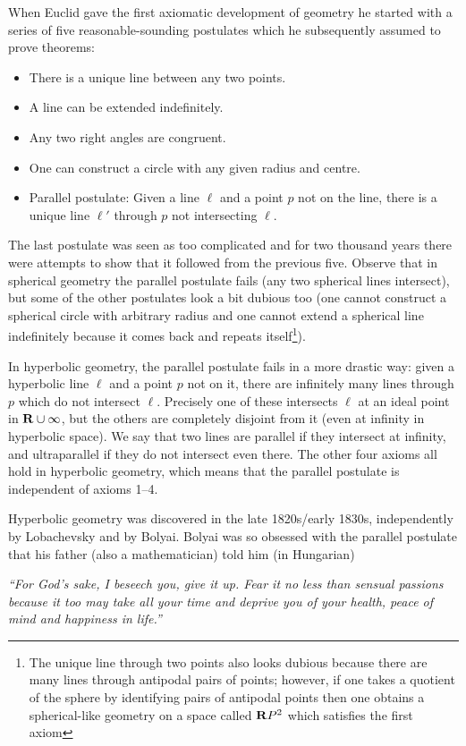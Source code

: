 \documentclass[12pt]{article}
\begin{document}
When Euclid gave the first axiomatic development of geometry he started with a series of five reasonable-sounding postulates which he subsequently assumed to prove theorems:
\begin{itemize}
\item There is a unique line between any two points.
\item A line can be extended indefinitely.
\item Any two right angles are congruent.
\item One can construct a circle with any given radius and centre.
\item Parallel postulate: Given a line $\ell$ and a point $p$ not on the line, there is a unique line $\ell'$ through $p$ not intersecting $\ell$.
\end{itemize}
The last postulate was seen as too complicated and for two thousand years there were attempts to show that it followed from the previous five. Observe that in spherical geometry the parallel postulate fails (any two spherical lines intersect), but some of the other postulates look a bit dubious too (one cannot construct a spherical circle with arbitrary radius and one cannot extend a spherical line indefinitely because it comes back and repeats itself\footnote{The unique line through two points also looks dubious because there are many lines through antipodal pairs of points; however, if one takes a quotient of the sphere by identifying pairs of antipodal points then one obtains a spherical-like geometry on a space called $\mathbf{R} P^2$ which satisfies the first axiom}).

In hyperbolic geometry, the parallel postulate fails in a more drastic way: given a hyperbolic line $\ell$ and a point $p$ not on it, there are infinitely many lines through $p$ which do not intersect $\ell$. Precisely one of these intersects $\ell$ at an ideal point in $\mathbf{R}\cup\infty$, but the others are completely disjoint from it (even at infinity in hyperbolic space). We say that two lines are parallel if they intersect at infinity, and ultraparallel if they do not intersect even there. The other four axioms all hold in hyperbolic geometry, which means that the parallel postulate is independent of axioms 1--4.

Hyperbolic geometry was discovered in the late 1820s/early 1830s, independently by Lobachevsky and by Bolyai. Bolyai was so obsessed with the parallel postulate that his father (also a mathematician) told him (in Hungarian)

{\em ``For God's sake, I beseech you, give it up. Fear it no less than sensual passions because it too may take all your time and deprive you of your health, peace of mind and happiness in life.''}
\end{document}
